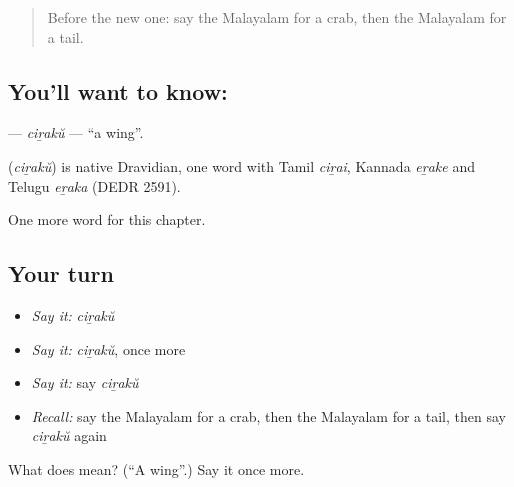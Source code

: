 \label{lesson:ML-C254-ciraku}



\begin{quote}
Before the new one: say the Malayalam for a crab, then the Malayalam for a tail.
\end{quote}

\subsection*{You'll want to know: }
\textbf{} — \emph{ciṟakŭ} — \textquotedblleft{}a wing\textquotedblright{}.

\begin{cousinweb}
\textbf{} (\emph{ciṟakŭ}) is native Dravidian, one word with Tamil \emph{ciṟai}, Kannada \emph{eṟake} and Telugu \emph{eṟaka} (DEDR 2591).
\end{cousinweb}

\begin{grammarlens}[title={What you've built}]
One more word for this chapter.
\end{grammarlens}

\subsection*{Your turn}
\begin{itemize}
\raggedright
  \item \emph{Say it:} \emph{ciṟakŭ}
  \item \emph{Say it:} \emph{ciṟakŭ}, once more
  \item \emph{Say it:} say \emph{ciṟakŭ}
  \item \emph{Recall:} say the Malayalam for a crab, then the Malayalam for a tail, then say \emph{ciṟakŭ} again
\end{itemize}

\begin{tcolorbox}[breakable,colback=teal!4,colframe=teal!35!black,title={Before you move on}]
What does  mean? (\textquotedblleft{}A wing\textquotedblright{}.) Say it once more.
\end{tcolorbox}
